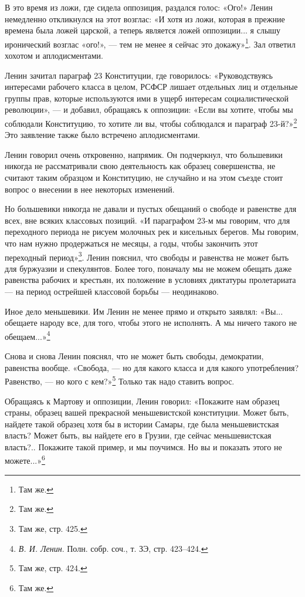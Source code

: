\documentclass[12pt, a4paper, openany]{book}
\begin{document}
В это время из ложи, где сидела оппозиция, раздался голос: «Ого!» Ленин немедленно откликнулся на этот возглас: «И хотя из ложи, которая в прежние времена была ложей царской, а теперь является ложей оппозиции... я слышу иронический возглас «ого!», — тем не менее я сейчас это докажу»\footnote{Там же.}. Зал ответил хохотом и аплодисментами.

Ленин зачитал параграф 23 Конституции, где говорилось: «Руководствуясь интересами рабочего класса в целом, РСФСР лишает отдельных лиц и отдельные группы прав, которые используются ими в ущерб интересам социалистической революции», — и добавил, обращаясь к оппозиции: «Если вы хотите, чтобы мы соблюдали Конституцию, то хотите ли вы, чтобы соблюдался и параграф 23-й?»\footnote{Там же.} Это заявление также было встречено аплодисментами.

Ленин говорил очень откровенно, напрямик. Он подчеркнул, что большевики никогда не рассматривали свою деятельность как образец совершенства, не считают таким образцом и Конституцию, не случайно и на этом съезде стоит вопрос о внесении в нее некоторых изменений.

Но большевики никогда не давали и пустых обещаний о свободе и равенстве для всех, вне всяких классовых позиций. «И параграфом 23-м мы говорим, что для переходного периода не рисуем молочных рек и кисельных берегов. Мы говорим, что нам нужно продержаться не месяцы, а годы, чтобы закончить этот переходный период»\footnote{Там же, стр. 425.}. Ленин пояснил, что свободы и равенства не может быть для буржуазии и спекулянтов. Более того, поначалу мы не можем обещать даже равенства рабочих и крестьян, их положение в условиях диктатуры пролетариата — на период острейшей классовой борьбы — неодинаково.

Иное дело меньшевики. Им Ленин не менее прямо и открыто заявлял: «Вы... обещаете народу все, для того, чтобы этого не исполнять. А мы ничего такого не обещаем...»\footnote{\textit{В. И. Ленин}. Полн. собр. соч., т. ЗЭ, стр. 423–424.}

Снова и снова Ленин пояснял, что не может быть свободы, демократии, равенства вообще. «Свобода, — но для какого класса и для какого употребления? Равенство, — но кого с кем?»\footnote{Там же, стр. 424.} Только так надо ставить вопрос.

Обращаясь к Мартову и оппозиции, Ленин говорил: «Покажите нам образец страны, образец вашей прекрасной меньшевистской конституции. Может быть, найдете такой образец хотя бы в истории Самары, где была меньшевистская власть? Может быть, вы найдете его в Грузии, где сейчас меньшевистская власть?.. Покажите такой пример, и мы поучимся. Но вы и показать этого не можете...»\footnote{Там же.}
\end{document}
